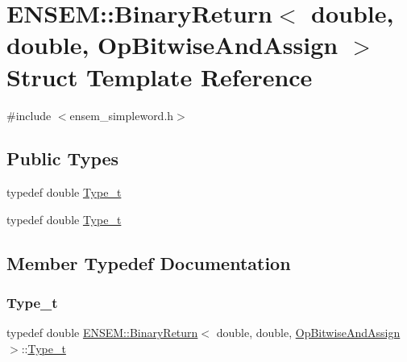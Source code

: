 \hypertarget{structENSEM_1_1BinaryReturn_3_01double_00_01double_00_01OpBitwiseAndAssign_01_4}{}\section{E\+N\+S\+EM\+:\+:Binary\+Return$<$ double, double, Op\+Bitwise\+And\+Assign $>$ Struct Template Reference}
\label{structENSEM_1_1BinaryReturn_3_01double_00_01double_00_01OpBitwiseAndAssign_01_4}


{\ttfamily \#include $<$ensem\+\_\+simpleword.\+h$>$}

\subsection*{Public Types}
\begin{DoxyCompactItemize}
\item 
typedef double \mbox{\hyperlink{structENSEM_1_1BinaryReturn_3_01double_00_01double_00_01OpBitwiseAndAssign_01_4_aa3e34db7c5a718f74845bd8e24088ed0}{Type\+\_\+t}}
\item 
typedef double \mbox{\hyperlink{structENSEM_1_1BinaryReturn_3_01double_00_01double_00_01OpBitwiseAndAssign_01_4_aa3e34db7c5a718f74845bd8e24088ed0}{Type\+\_\+t}}
\end{DoxyCompactItemize}


\subsection{Member Typedef Documentation}
\mbox{\label{structENSEM_1_1BinaryReturn_3_01double_00_01double_00_01OpBitwiseAndAssign_01_4_aa3e34db7c5a718f74845bd8e24088ed0}} 
\subsubsection{\texorpdfstring{Type\_t}{Type\_t}\hspace{0.1cm}{\footnotesize\ttfamily [1/2]}}
{\footnotesize\ttfamily typedef double \mbox{\hyperlink{structENSEM_1_1BinaryReturn}{E\+N\+S\+E\+M\+::\+Binary\+Return}}$<$ double, double, \mbox{\hyperlink{structENSEM_1_1OpBitwiseAndAssign}{Op\+Bitwise\+And\+Assign}} $>$\+::\mbox{\hyperlink{structENSEM_1_1BinaryReturn_3_01double_00_01double_00_01OpBitwiseAndAssign_01_4_aa3e34db7c5a718f74845bd8e24088ed0}{Type\+\_\+t}}}

